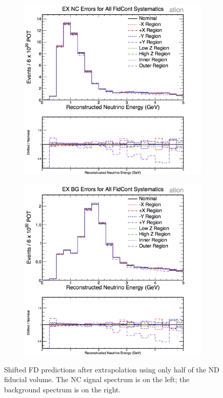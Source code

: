 \begin{figure}[h]
  \centering
  \begin{subfigure}{.48\textwidth}
    \centering
    \includegraphics[width=1\linewidth]{figures/cNCEXFidContSysts.png}
  \end{subfigure}
  \begin{subfigure}{.48\textwidth}
    \centering
    \includegraphics[width=1\linewidth]{figures/cBGEXFidContSysts.png}
  \end{subfigure}
  \caption[Shifted FD Predictions from Extrapolation of Halves of the ND]{Shifted FD predictions after extrapolation using only half of the ND fiducial volume. The NC signal spectrum is on the left; the background spectrum is on the right.}
  \label{fig:SystFidCont}
\end{figure}

